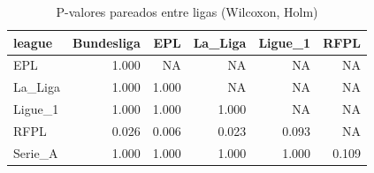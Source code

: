 \begin{table}

\caption{\label{tab:pareado_ligas_g10}P-valores pareados entre ligas (Wilcoxon, Holm)}
\centering
\begin{tabular}[t]{lrrrrr}
\toprule
league & Bundesliga & EPL & La\_Liga & Ligue\_1 & RFPL\\
\midrule
EPL & 1.000 & NA & NA & NA & NA\\
La\_Liga & 1.000 & 1.000 & NA & NA & NA\\
Ligue\_1 & 1.000 & 1.000 & 1.000 & NA & NA\\
RFPL & 0.026 & 0.006 & 0.023 & 0.093 & NA\\
Serie\_A & 1.000 & 1.000 & 1.000 & 1.000 & 0.109\\
\bottomrule
\end{tabular}
\end{table}
